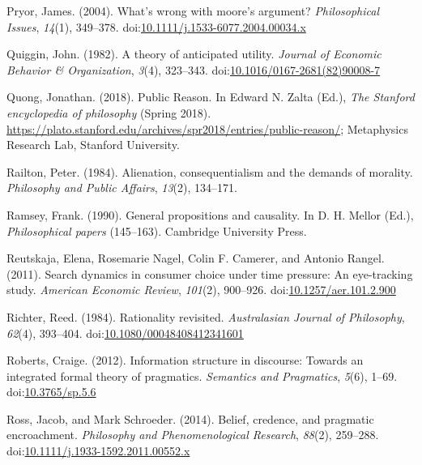 \documentclass[
  12pt,
  letterpaper,
]{scrbook}
\newlength{\cslhangindent}
\newenvironment{CSLReferences}[2] %
 {\begin{list}{}{%
  \setlength{\itemindent}{0pt}
  \setlength{\leftmargin}{0pt}
  \setlength{\parsep}{0pt}
  \ifodd #1
   \setlength{\leftmargin}{\cslhangindent}
   \setlength{\itemindent}{-1\cslhangindent}
  \fi
  \setlength{\itemsep}{#2\baselineskip}}}
 {\end{list}}
\begin{document}
\begin{CSLReferences}{1}{0}
Pryor, James. (2004). What's wrong with moore's argument?
\emph{Philosophical Issues}, \emph{14}(1), 349--378.
doi:\href{https://doi.org/10.1111/j.1533-6077.2004.00034.x}{10.1111/j.1533-6077.2004.00034.x}

Quiggin, John. (1982). A theory of anticipated utility. \emph{Journal of
Economic Behavior \& Organization}, \emph{3}(4), 323--343.
doi:\href{https://doi.org/10.1016/0167-2681(82)90008-7}{10.1016/0167-2681(82)90008-7}

Quong, Jonathan. (2018). {Public Reason}. In Edward N. Zalta (Ed.),
\emph{The {Stanford} encyclopedia of philosophy} ({S}pring 2018).
\url{https://plato.stanford.edu/archives/spr2018/entries/public-reason/};
Metaphysics Research Lab, Stanford University.

Railton, Peter. (1984). Alienation, consequentialism and the demands of
morality. \emph{Philosophy and Public Affairs}, \emph{13}(2), 134--171.

Ramsey, Frank. (1990). General propositions and causality. In D. H.
Mellor (Ed.), \emph{Philosophical papers} (145--163). Cambridge
University Press.

Reutskaja, Elena, Rosemarie Nagel, Colin F. Camerer, and Antonio Rangel.
(2011). Search dynamics in consumer choice under time pressure: An
eye-tracking study. \emph{American Economic Review}, \emph{101}(2),
900--926.
doi:\href{https://doi.org/10.1257/aer.101.2.900}{10.1257/aer.101.2.900}

Richter, Reed. (1984). Rationality revisited. \emph{Australasian Journal
of Philosophy}, \emph{62}(4), 393--404.
doi:\href{https://doi.org/10.1080/00048408412341601}{10.1080/00048408412341601}

Roberts, Craige. (2012). Information structure in discourse: Towards an
integrated formal theory of pragmatics. \emph{Semantics and Pragmatics},
\emph{5}(6), 1--69.
doi:\href{https://doi.org/10.3765/sp.5.6}{10.3765/sp.5.6}

Ross, Jacob, and Mark Schroeder. (2014). Belief, credence, and pragmatic
encroachment. \emph{Philosophy and Phenomenological Research},
\emph{88}(2), 259--288.
doi:\href{https://doi.org/10.1111/j.1933-1592.2011.00552.x}{10.1111/j.1933-1592.2011.00552.x}


\end{CSLReferences}
\end{document}
